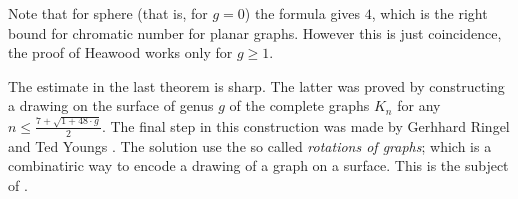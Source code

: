 Note that for sphere (that is, for $g=0$) the formula gives $4$, which is the right bound for chromatic number for planar graphs. 
However this is just coincidence, the proof of Heawood works only for $g\ge 1$.

The estimate in the last theorem is sharp.
The latter was proved by constructing a drawing on the surface of genus $g$
of the complete graphs $K_n$ for any $n\le\frac{7+\sqrt{1+48\cdot g}}2$.
The final step in this construction was made by Gerhhard Ringel and Ted Youngs \cite{ringel-youngs}.
The solution use the so called \emph{rotations of graphs}; which is a combinatiric way to encode a drawing of a graph on a surface.
This is the subject of \cite[Chapter 10]{hartsfield-ringel}.


